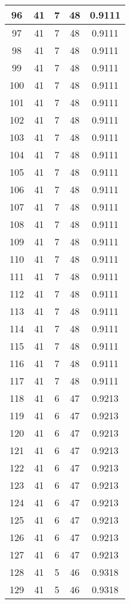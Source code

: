 \documentclass[letterpaper, 12pt]{article}
\begin{document}
\begin{longtable}{|c|c|c|c|c|}
\hline
96 & 41 & 7 & 48 & 0.9111 \\
\hline
97 & 41 & 7 & 48 & 0.9111 \\
\hline
98 & 41 & 7 & 48 & 0.9111 \\
\hline
99 & 41 & 7 & 48 & 0.9111 \\
\hline
100 & 41 & 7 & 48 & 0.9111 \\
\hline
101 & 41 & 7 & 48 & 0.9111 \\
\hline
102 & 41 & 7 & 48 & 0.9111 \\
\hline
103 & 41 & 7 & 48 & 0.9111 \\
\hline
104 & 41 & 7 & 48 & 0.9111 \\
\hline
105 & 41 & 7 & 48 & 0.9111 \\
\hline
106 & 41 & 7 & 48 & 0.9111 \\
\hline
107 & 41 & 7 & 48 & 0.9111 \\
\hline
108 & 41 & 7 & 48 & 0.9111 \\
\hline
109 & 41 & 7 & 48 & 0.9111 \\
\hline
110 & 41 & 7 & 48 & 0.9111 \\
\hline
111 & 41 & 7 & 48 & 0.9111 \\
\hline
112 & 41 & 7 & 48 & 0.9111 \\
\hline
113 & 41 & 7 & 48 & 0.9111 \\
\hline
114 & 41 & 7 & 48 & 0.9111 \\
\hline
115 & 41 & 7 & 48 & 0.9111 \\
\hline
116 & 41 & 7 & 48 & 0.9111 \\
\hline
117 & 41 & 7 & 48 & 0.9111 \\
\hline
118 & 41 & 6 & 47 & 0.9213 \\
\hline
119 & 41 & 6 & 47 & 0.9213 \\
\hline
120 & 41 & 6 & 47 & 0.9213 \\
\hline
121 & 41 & 6 & 47 & 0.9213 \\
\hline
122 & 41 & 6 & 47 & 0.9213 \\
\hline
123 & 41 & 6 & 47 & 0.9213 \\
\hline
124 & 41 & 6 & 47 & 0.9213 \\
\hline
125 & 41 & 6 & 47 & 0.9213 \\
\hline
126 & 41 & 6 & 47 & 0.9213 \\
\hline
127 & 41 & 6 & 47 & 0.9213 \\
\hline
128 & 41 & 5 & 46 & 0.9318 \\
\hline
129 & 41 & 5 & 46 & 0.9318 \\

\end{longtable}
\end{document}
